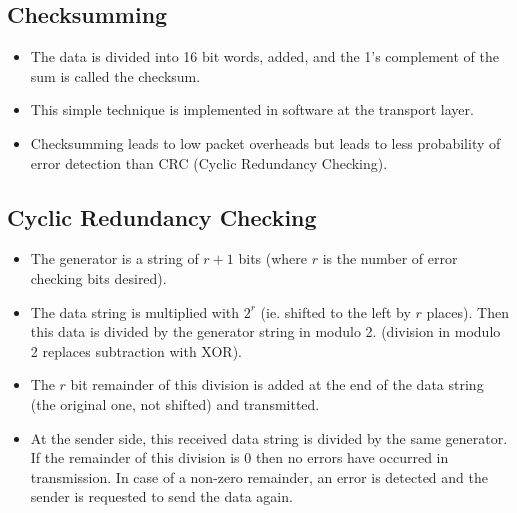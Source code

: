\documentclass[a4paper]{article}
\theoremstyle{plain}
\theoremstyle{definition}
\begin{document}
\subsection{Checksumming}
\begin{itemize}
    \item The data is divided into 16 bit words, added, and the 1's complement of the sum is called the checksum. 
    
    \item This simple technique is implemented in software at the transport layer. 
    
    \item Checksumming leads to low packet overheads but leads to less probability of error detection than CRC (Cyclic Redundancy Checking). 
\end{itemize}

\subsection{Cyclic Redundancy Checking}
\begin{itemize}
    \item The generator is a string of $r+1$ bits (where $r$ is the number of error checking bits desired). 
    
    \item The data string is multiplied with $2^r$ (ie. shifted to the left by $r$ places). Then this data is divided by the generator string in modulo 2. (division in modulo 2 replaces subtraction with XOR). 
    
    \item The $r$ bit remainder of this division is added at the end of the data string (the original one, not shifted) and transmitted. 
    
    \item At the sender side, this received data string is divided by the same generator. If the remainder of this division is 0 then no errors have occurred in transmission. In case of a non-zero remainder, an error is detected and the sender is requested to send the data again. 
\end{itemize}
\end{document}
